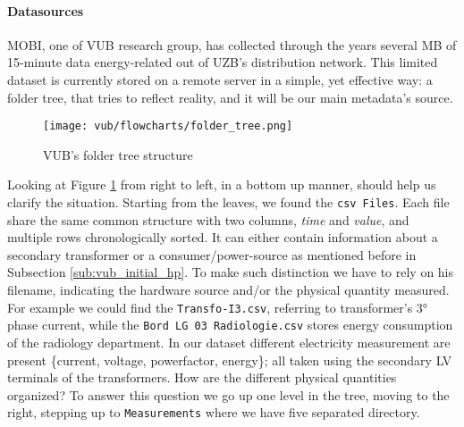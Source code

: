 \paragraph{Datasources}
MOBI, one of \ac{VUB} research group, has collected through the years several MB of 15-minute data energy-related out of \ac{UZB}'s distribution network.
This limited dataset is currently stored on a remote server in a simple, yet effective way: 
a folder tree, that tries to reflect reality, and it will be our main metadata's source. 

\begin{figure}[ht]
    \texttt{[image: vub/flowcharts/folder\_tree.png]}
    \caption{\ac{VUB}'s folder tree structure}
    \label{fig:vub_folder_tree}
\end{figure}
Looking at Figure \ref{fig:vub_folder_tree} from right to left, in a bottom up manner, should help us clarify the situation. %
Starting from the leaves, we found the \texttt{\ac{csv} Files}. Each file share the same common structure with two columns, \textit{time} and \textit{value}, and multiple rows chronologically sorted.
It can either contain information about a secondary transformer or a consumer/power-source as mentioned before in Subsection \ref{sub:vub_initial_hp}. 
To make such distinction we have to rely on his filename, indicating the hardware source and/or the physical quantity measured.
For example we could find the \texttt{Transfo-I3.csv}, referring to transformer's 3° phase current, while the \texttt{Bord LG 03 Radiologie.csv} stores energy consumption of the radiology department.
In our dataset different electricity measurement are present \{current, voltage, power\-factor, energy\}; all taken using the secondary \ac{LV} terminals of the transformers.
How are the different physical quantities organized? 
To answer this question we go up one level in the tree, moving to the right, stepping up to \texttt{Measurements} where we have five separated directory.

